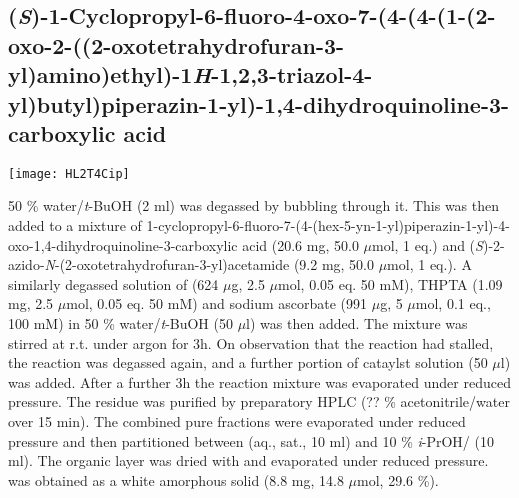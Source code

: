 {{{{{{{{\subsection{(\textit{S})-1-Cyclopropyl-6-fluoro-4-oxo-7-(4-(4-(1-(2-oxo-2-((2-oxotetrahydrofuran-3-yl)amino)ethyl)-1\textit{H}-1,2,3-triazol-4-yl)butyl)piperazin-1-yl)-1,4-dihydroquinoline-3-carboxylic acid }
	
	
	\begin{scheme}[H]
		\begin{center}
			\texttt{[image: HL2T4Cip]}
		\end{center}
	\end{scheme}

50 \% water/\textit{t}-BuOH (2 ml) was degassed by bubbling  through it. This was then added to a mixture of 1-cyclopropyl-6-fluoro-7-(4-(hex-5-yn-1-yl)piperazin-1-yl)-4-oxo-1,4\hyp{}dihydro\-quinoline-3-carboxylic acid  (20.6 mg, 50.0 $\mu$mol, 1 eq.) and (\textit{S})-2-azido-\textit{N}-(2-oxotetrahydrofuran-3-yl)acetamide  (9.2 mg, 50.0 $\mu$mol, 1 eq.).
A similarly degassed solution of  (624 $\mu$g, 2.5 $\mu$mol, 0.05 eq. 50 mM), THPTA (1.09 mg, 2.5 $\mu$mol, 0.05 eq. 50 mM) and sodium ascorbate (991 $\mu$g, 5 $\mu$mol, 0.1 eq., 100 mM) in 50 \% water/\textit{t}-BuOH (50 $\mu$l) was then added. 
The mixture was stirred at r.t. under argon for 3h. On observation that the reaction had stalled, the reaction was degassed again, and a further portion of cataylst solution (50 $\mu$l) was added.
After a further 3h the reaction mixture was evaporated under reduced pressure. The residue was purified by preparatory HPLC (?? \% acetonitrile/water over 15 min). 
The combined pure fractions were evaporated under reduced pressure and then partitioned between  (aq., sat., 10 ml) and 10 \% \textit{i}-PrOH/ (10 ml). The organic layer was dried with  and evaporated under reduced pressure.
 was obtained as a white amorphous solid (8.8 mg, 14.8 $\mu$mol, 29.6 \%).
\\[1\baselineskip]
}}}}}}}}
